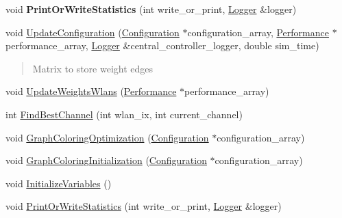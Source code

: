 \begin{DoxyCompactItemize}
\mbox{\label{classGraphColoring_a6c3b2f0e1cc3529604030302bbccd487}} 
void {\bfseries Print\+Or\+Write\+Statistics} (int write\+\_\+or\+\_\+print, \hyperlink{structLogger}{Logger} \&logger)
\item 
void \hyperlink{classGraphColoring_a8f0762e3222dac3389e315dbf6fac75e}{Update\+Configuration} (\hyperlink{structConfiguration}{Configuration} $\ast$configuration\+\_\+array, \hyperlink{structPerformance}{Performance} $\ast$performance\+\_\+array, \hyperlink{structLogger}{Logger} \&central\+\_\+controller\+\_\+logger, double sim\+\_\+time)
\begin{DoxyCompactList}\small\item\em \begin{quote}
Matrix to store weight edges \end{quote}
\end{DoxyCompactList}\item 
void \hyperlink{classGraphColoring_a59aa0d25ab43d5e0a1333737e90a07d6}{Update\+Weights\+Wlans} (\hyperlink{structPerformance}{Performance} $\ast$performance\+\_\+array)
\item 
int \hyperlink{classGraphColoring_ab15cb08c098dbc3edb271b38de730b9f}{Find\+Best\+Channel} (int wlan\+\_\+ix, int current\+\_\+channel)
\item 
void \hyperlink{classGraphColoring_a45f12d87a4c2a4f7a1d0b5ca299aacfb}{Graph\+Coloring\+Optimization} (\hyperlink{structConfiguration}{Configuration} $\ast$configuration\+\_\+array)
\item 
void \hyperlink{classGraphColoring_af254562a02df4b73c63aa7c1539cfbb2}{Graph\+Coloring\+Initialization} (\hyperlink{structConfiguration}{Configuration} $\ast$configuration\+\_\+array)
\item 
void \hyperlink{classGraphColoring_ae67e3e5361b5d85a815bd4c4445392fb}{Initialize\+Variables} ()
\item 
void \hyperlink{classGraphColoring_a6c3b2f0e1cc3529604030302bbccd487}{Print\+Or\+Write\+Statistics} (int write\+\_\+or\+\_\+print, \hyperlink{structLogger}{Logger} \&logger)
\end{DoxyCompactItemize}

